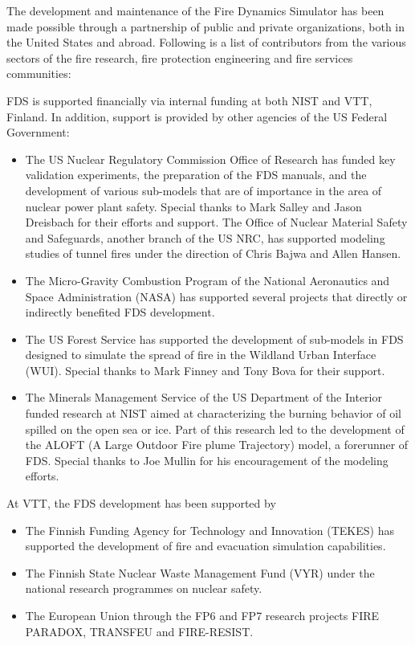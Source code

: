 \documentclass[11pt]{book}
\begin{document}
\label{acksection}

The development and maintenance of the Fire Dynamics Simulator has been made possible through
a partnership of public and private organizations, both in the United States and abroad. Following
is a list of contributors from the various sectors of the fire research, fire protection engineering and
fire services communities:

FDS is supported financially via internal funding at both NIST and
VTT, Finland. In addition, support is provided by other agencies of
the US Federal Government:
\begin{itemize}
\item The US Nuclear Regulatory Commission Office of Research has funded key
validation experiments, the preparation of the FDS manuals, and the
development of various sub-models that are of importance in the area
of nuclear power plant safety. Special thanks to Mark Salley and Jason
Dreisbach for their efforts and support.  The Office of Nuclear
Material Safety and Safeguards, another branch of the US NRC, has
supported modeling studies of tunnel fires under the direction of
Chris Bajwa and Allen Hansen.
\item The Micro-Gravity Combustion Program of the National Aeronautics and Space
Administration (NASA) has supported several projects that directly or indirectly benefited FDS development.
\item The US Forest Service has supported the development of sub-models in FDS designed to simulate the spread of
fire in the Wildland Urban Interface (WUI). Special thanks to Mark Finney and Tony Bova for their support.
\item The Minerals Management Service of the US Department of the Interior funded research at NIST aimed at
characterizing the burning behavior of oil spilled on the open sea or ice. Part of this research led to the development
of the ALOFT (A Large Outdoor Fire plume Trajectory) model, a forerunner of FDS. Special thanks to Joe Mullin for his
encouragement of the modeling efforts.
\end{itemize}
\noindent At VTT, the FDS development has been supported by
\begin{itemize}
\item The Finnish Funding Agency for Technology and Innovation (TEKES) has supported the development of fire and evacuation simulation capabilities.
\item The Finnish State Nuclear Waste Management Fund (VYR) under the national research programmes on nuclear safety.
\item The European Union through the FP6 and FP7 research projects FIRE PARADOX, TRANSFEU and FIRE-RESIST.
\end{itemize}
\end{document}
